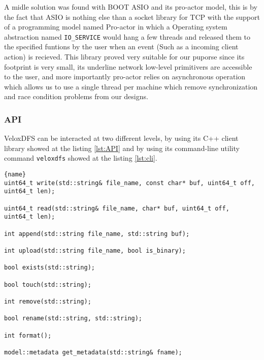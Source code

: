A midle solution was found with BOOT ASIO and its pro-actor model, this is by the fact that ASIO is nothing else than a socket library for TCP with the support of a programming model named Pro-actor in which a Operating system abstraction named \texttt{IO\_SERVICE} would hang a few threads and released them to the specified funtions by the user when an event (Such as a incoming client action) is recieved. This library proved very suitable for our puporse since its  footprint is very small, its underline network low-level primitivers are accessible to the user, and more importantly pro-actor relies on asynchronous operation which allows us to use a single thread per machine which remove synchronization and race condition problems from our designs.

\subsubsection{API}

VeloxDFS can be interacted at two different levels, by using its C++ client library showed at the listing \ref{lst:API} and by using its command-line utility command \texttt{veloxdfs} showed at the listing \ref{lst:cli}. \\

\begin{lstlisting}[caption=extracted from DFS.h, label={lst:API}, frame=tb]{name}
uint64_t write(std::string& file_name, const char* buf, uint64_t off, uint64_t len);
 
uint64_t read(std::string& file_name, char* buf, uint64_t off, uint64_t len);

int append(std::string file_name, std::string buf);

int upload(std::string file_name, bool is_binary);

bool exists(std::string);

bool touch(std::string);

int remove(std::string);

bool rename(std::string, std::string);

int format();

model::metadata get_metadata(std::string& fname);
\end{lstlisting}

